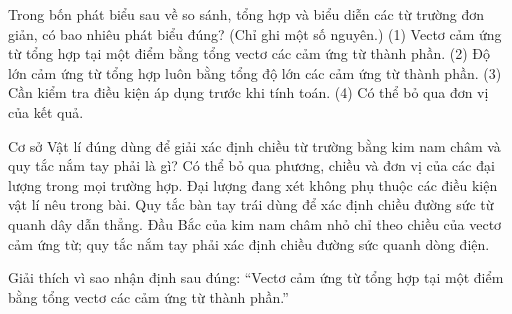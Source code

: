 \begin{ex}
Trong bốn phát biểu sau về so sánh, tổng hợp và biểu diễn các từ trường đơn giản, có bao nhiêu phát biểu đúng? (Chỉ ghi một số nguyên.) (1) Vectơ cảm ứng từ tổng hợp tại một điểm bằng tổng vectơ các cảm ứng từ thành phần. (2) Độ lớn cảm ứng từ tổng hợp luôn bằng tổng độ lớn các cảm ứng từ thành phần. (3) Cần kiểm tra điều kiện áp dụng trước khi tính toán. (4) Có thể bỏ qua đơn vị của kết quả.
\end{ex}

\begin{ex}
Cơ sở Vật lí đúng dùng để giải xác định chiều từ trường bằng kim nam châm và quy tắc nắm tay phải là gì?
\choice
{Có thể bỏ qua phương, chiều và đơn vị của các đại lượng trong mọi trường hợp.}
{Đại lượng đang xét không phụ thuộc các điều kiện vật lí nêu trong bài.}
{Quy tắc bàn tay trái dùng để xác định chiều đường sức từ quanh dây dẫn thẳng.}
{\True Đầu Bắc của kim nam châm nhỏ chỉ theo chiều của vectơ cảm ứng từ; quy tắc nắm tay phải xác định chiều đường sức quanh dòng điện.}
\end{ex}

\begin{bt}
Giải thích vì sao nhận định sau đúng: “Vectơ cảm ứng từ tổng hợp tại một điểm bằng tổng vectơ các cảm ứng từ thành phần.”
\end{bt}

